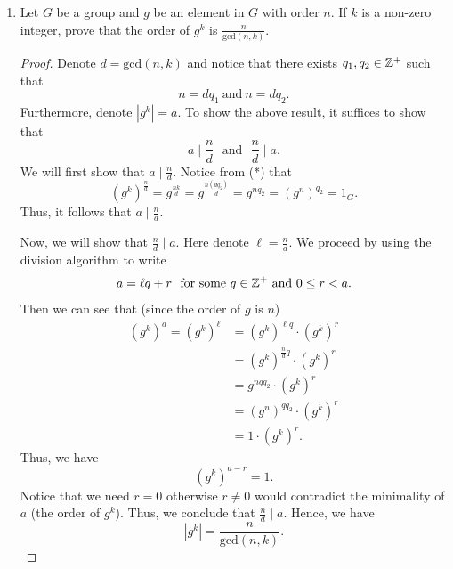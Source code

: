 \documentclass[a4paper]{article}
\begin{document}
\begin{problem}
    \begin{enumerate}
        \item[(a)] Let \( G  \) be a group and \( g  \) be an element in \( G  \) with order \( n  \). If \( k  \) is a non-zero integer, prove that the order of \( g^{k}  \) is \( \displaystyle \frac{ n  }{  \text{gcd}(n,k) }  \).
            \begin{proof}
                Denote \( d = \text{gcd} (n,k)  \) and notice that there exists \( {q}_{1}, {q}_{2} \in \mathbb{Z}^{+} \) such that 
                \[  n = d {q}_{1} \ \text{and} \ n = d {q}_{2}. \tag{*} \]
                Furthermore, denote \( | g^{k}  |  = a  \).
                To show the above result, it suffices to show that 
                \[  a \mid \frac{ n }{ d } \ \  \  \text{and} \  \  \ \frac{ n }{ d }  \mid a. \tag{\( \dagger \)}  \]
            We will first show that \( a \mid \frac{ n }{ d } \). Notice from (*) that 
            \[  (g^{k})^{\frac{ n }{ d }} = g^{\frac{ nk }{ d }} = g^{\frac{ n(d {q}_{2})  }{ d } } = g^{n {q}_{2}} = (g^{n})^{{q}_{2}} = {1}_{G}. \]
            Thus, it follows that \( a \mid \frac{ n }{ d }   \).

            Now, we will show that \( \frac{ n }{ d }  \mid  a  \). Here denote \( \ell = \frac{ n }{ d }  \). We proceed by using the division algorithm to write
            \[  a = \ell q + r \ \ \text{for some} \ q \in \mathbb{Z}^{+} \ \text{and} \ 0 \leq r < a.   \]
       Then we can see that (since the order of \( g  \) is \(  n \))
            \begin{align*}
                (g^{k})^{a} = (g^{k})^{\ell} &= (g^{k})^{\ell q} \cdot (g^{k})^{r} \\
                                             &=(g^{k})^{\frac{ n }{ d } q } \cdot (g^{k})^{r} \\      
                                             &= g^{n q {q}_{2}} \cdot (g^{k})^{r} \\ 
                                             &= (g^{n})^{q {q}_{2}} \cdot (g^{k})^{r} \\
                                             &= 1 \cdot (g^{k})^{r}.
            \end{align*}
            Thus, we have
            \[  (g^{k})^{a - r} = 1.  \]
            Notice that we need \( r = 0 \) otherwise \( r \neq 0  \) would contradict the minimality of \( a  \) (the order of \( g^{k} \)). Thus, we conclude that \( \frac{ n }{ d }  \mid a  \). Hence, we have 
            \[  | g^{k} |  = \frac{ n }{ \text{gcd}(n,k) }.  \]


\end{proof}
\end{enumerate}
\end{problem}
\end{document}
